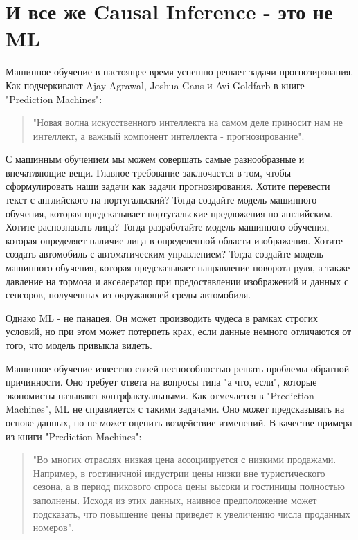 \documentclass{article}
\begin{document}
    \section*{И все же Causal Inference - это не ML}
        Машинное обучение в настоящее время успешно решает задачи прогнозирования. Как подчеркивают Ajay Agrawal, Joshua Gans и Avi Goldfarb в книге "Prediction Machines":

        \begin{quote}
            "Новая волна искусственного интеллекта на самом деле приносит нам не интеллект, а важный компонент интеллекта - прогнозирование".
        \end{quote}

        С машинным обучением мы можем совершать самые разнообразные и впечатляющие вещи. Главное требование заключается в том, чтобы сформулировать наши задачи как задачи прогнозирования. Хотите перевести текст с английского на португальский? Тогда создайте модель машинного обучения, которая предсказывает португальские предложения по английским. Хотите распознавать лица? Тогда разработайте модель машинного обучения, которая определяет наличие лица в определенной области изображения. Хотите создать автомобиль с автоматическим управлением? Тогда создайте модель машинного обучения, которая предсказывает направление поворота руля, а также давление на тормоза и акселератор при предоставлении изображений и данных с сенсоров, полученных из окружающей среды автомобиля.


        Однако ML - не панацея. Он может производить чудеса в рамках строгих условий, но при этом может потерпеть крах, если данные немного отличаются от того, что модель привыкла видеть.


        Машинное обучение известно своей неспособностью решать проблемы обратной причинности. Оно требует ответа на вопросы типа "а что, если"{}, которые экономисты называют контрфактуальными. Как отмечается в "Prediction Machines"{}, ML не справляется с такими задачами. Оно может предсказывать на основе данных, но не может оценить воздействие изменений. В качестве примера из книги "Prediction Machines":

        \begin{quote}
            "Во многих отраслях низкая цена ассоциируется с низкими продажами. Например, в гостиничной индустрии цены низки вне туристического сезона, а в период пикового спроса цены высоки и гостиницы полностью заполнены. Исходя из этих данных, наивное предположение может подсказать, что повышение цены приведет к увеличению числа проданных номеров".
        \end{quote}
\end{document}
